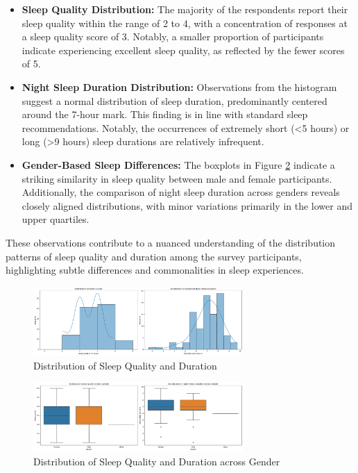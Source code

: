 \documentclass[conference]{IEEEtran}
\begin{document}
\begin{itemize}
    \item \textbf{Sleep Quality Distribution:}
          The majority of the respondents report their sleep quality within the range of 2 to 4, with a concentration of responses at a sleep quality score of 3. Notably, a smaller proportion of participants indicate experiencing excellent sleep quality, as reflected by the fewer scores of 5.

    \item \textbf{Night Sleep Duration Distribution:}
          Observations from the histogram suggest a normal distribution of sleep duration, predominantly centered around the 7-hour mark. This finding is in line with standard sleep recommendations. Notably, the occurrences of extremely short (\textless 5 hours) or long (\textgreater 9 hours) sleep durations are relatively infrequent.

    \item \textbf{Gender-Based Sleep Differences:}
          The boxplots in Figure \ref{fig:distsleepwm} indicate a striking similarity in sleep quality between male and female participants. Additionally, the comparison of night sleep duration across genders reveals closely aligned distributions, with minor variations primarily in the lower and upper quartiles.
\end{itemize}

These observations contribute to a nuanced understanding of the distribution patterns of sleep quality and duration among the survey participants, highlighting subtle differences and commonalities in sleep experiences.

\begin{figure}[ht]
    \centering
    \includegraphics[width=8cm]{images/distsleep.png}
    \caption{Distribution of Sleep Quality and Duration}
    \label{fig:distsleep}
\end{figure}
\begin{figure}[ht]
    \centering
    \includegraphics[width=8cm]{images/distsleepwm.png}
    \caption{Distribution of Sleep Quality and Duration across Gender}
    \label{fig:distsleepwm}
\end{figure}
\end{document}
